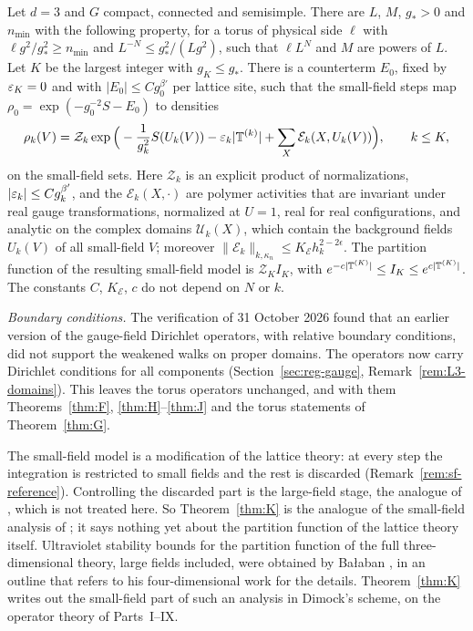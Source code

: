 \begin{maintheorem}\label{thm:K}
Let $d=3$ and $G$ compact, connected and semisimple. There are $L$, $M$, $g_*>0$ and $n_{\min}$ with the following property, for a torus of physical side $\ell$ with $\ell g^2/g_*^2\ge n_{\min}$ and $L^{-N}\le g_*^2/(Lg^2)$, such that $\ell L^N$ and $M$ are powers of $L$. Let $K$ be the largest integer with $g_K\le g_*$. There is a counterterm $E_0$, fixed by $\varepsilon_K=0$ and with $|E_0|\le Cg_0^{\beta'}$ per lattice site, such that the small-field steps map $\rho_0=\exp(-g_0^{-2}S-E_0)$ to densities
\[
\rho_k(V)=\mathcal Z_k\exp\Big(-\frac1{g_k^2}S(U_k(V))-\varepsilon_k|\mathbb T^{(k)}|+\sum_X\mathcal E_k(X,U_k(V))\Big),\qquad k\le K,
\]
on the small-field sets. Here $\mathcal Z_k$ is an explicit product of normalizations, $|\varepsilon_k|\le Cg_k^{\beta'}$, and the $\mathcal E_k(X,\cdot)$ are polymer activities that are invariant under real gauge transformations, normalized at $U=1$, real for real configurations, and analytic on the complex domains $\mathcal U_k(X)$, which contain the background fields $U_k(V)$ of all small-field $V$; moreover $\|\mathcal E_k\|_{k,\kappa_n}\le K_{\mathcal E}h_k^{2-2\epsilon}$. The partition function of the resulting small-field model is $\mathcal Z_KI_K$, with $e^{-c|\mathbb T^{(K)}|}\le I_K\le e^{c|\mathbb T^{(K)}|}$. The constants $C$, $K_{\mathcal E}$, $c$ do not depend on $N$ or $k$.
\end{maintheorem}

\emph{Boundary conditions.} The verification of 31 October 2026 found that an earlier version of the gauge-field Dirichlet operators, with relative boundary conditions, did not support the weakened walks on proper domains. The operators now carry Dirichlet conditions for all components (Section~\ref{sec:reg-gauge}, Remark~\ref{rem:L3-domains}). This leaves the torus operators unchanged, and with them Theorems~\ref{thm:F}, \ref{thm:H}--\ref{thm:J} and the torus statements of Theorem~\ref{thm:G}.

The small-field model is a modification of the lattice theory: at every step the integration is restricted to small fields and the rest is discarded (Remark~\ref{rem:sf-reference}). Controlling the discarded part is the large-field stage, the analogue of \cite{DimockII,DimockIII}, which is not treated here. So Theorem~\ref{thm:K} is the analogue of the small-field analysis of \cite{DimockI}; it says nothing yet about the partition function of the lattice theory itself. Ultraviolet stability bounds for the partition function of the full three-dimensional theory, large fields included, were obtained by Ba\l aban \cite{BalUV3}, in an outline that refers to his four-dimensional work for the details. Theorem~\ref{thm:K} writes out the small-field part of such an analysis in Dimock's scheme, on the operator theory of Parts~I--IX.

